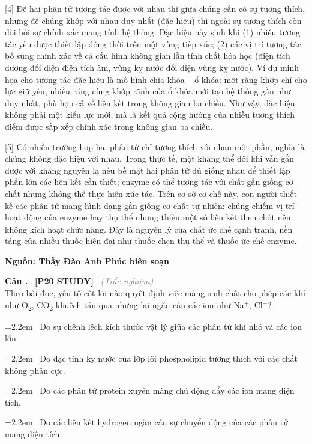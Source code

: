 \documentclass[12pt,a4paper,twoside]{article}
\newcounter{qcounter}
\newcommand{\question}[2][]{%
    \stepcounter{qcounter}%
    \par\vspace{5pt}%
    \noindent\textcolor{primaryBlue}{\textbf{Câu \theqcounter.}}~%
    \textcolor{secondaryBlue}{\small\textbf{[P20 STUDY]}}~%
    \if\relax\detokenize{#1}\relax\else\textcolor{gray}{\small\textit{(#1)}}~\fi\\[1pt]
    \noindent #2%
}
\newcommand{\choiceitem}[2]{%
    \tikz[baseline=-0.5ex]{
        \node[draw=primaryBlue, circle, minimum size=1.5em, inner sep=0pt, thick] {\textbf{#1}};
    }~#2%
}
\newenvironment{readingpassage}[1][]{%
    \begin{tcolorbox}[enhanced, colback=grayLight, colframe=secondaryBlue,
        coltitle=textDark, fonttitle=\bfseries, title={#1},
        rounded corners, arc=3mm, boxrule=1pt,
        left=15pt, right=15pt, top=10pt, bottom=10pt,
        breakable, before skip=10pt, after skip=10pt, drop fuzzy shadow]
    \setstretch{1.3}
}{\end{tcolorbox}}
\begin{document}
\begin{readingpassage}[]
[4] Để hai phân tử tương tác được với nhau thì giữa chúng cần có sự tương thích, nhưng để chúng khớp với nhau duy nhất (đặc hiệu) thì ngoài sự tương thích còn đòi hỏi sự chính xác mang tính hệ thống. Đặc hiệu nảy sinh khi (1) nhiều tương tác yếu được thiết lập đồng thời trên một vùng tiếp xúc; (2) các vị trí tương tác bổ sung chính xác về cả cấu hình không gian lẫn tính chất hóa học (điện tích dương đối diện điện tích âm, vùng kỵ nước đối diện vùng kỵ nước). Ví dụ minh họa cho tương tác đặc hiệu là mô hình chìa khóa -- ổ khóa: một răng khớp chỉ cho lực giữ yếu, nhiều răng cùng khớp rãnh của ổ khóa mới tạo hệ thống gần như duy nhất, phù hợp cả về liên kết trong không gian ba chiều. Như vậy, đặc hiệu không phải một kiểu lực mới, mà là kết quả cộng hưởng của nhiều tương thích điểm được sắp xếp chính xác trong không gian ba chiều.

[5] Có nhiều trường hợp hai phân tử chỉ tương thích với nhau một phần, nghĩa là chúng không đặc hiệu với nhau. Trong thực tế, một kháng thể đôi khi vẫn gắn được với kháng nguyên lạ nếu bề mặt hai phân tử đủ giống nhau để thiết lập phần lớn các liên kết cần thiết; enzyme có thể tương tác với chất gần giống cơ chất nhưng không thể thực hiện xúc tác. Trên cơ sở cơ chế này, con người thiết kế các phân tử mang hình dạng gần giống cơ chất tự nhiên: chúng chiếm vị trí hoạt động của enzyme hay thụ thể nhưng thiếu một số liên kết then chốt nên không kích hoạt chức năng. Đây là nguyên lý của chất ức chế cạnh tranh, nền tảng của nhiều thuốc hiện đại như thuốc chẹn thụ thể và thuốc ức chế enzyme.

\hfill\textbf{Nguồn: Thầy Đào Anh Phúc biên soạn}

\end{readingpassage}
\vspace{2pt}

\question[Trắc nghiệm]{Theo bài đọc, yếu tố cốt lõi nào quyết định việc màng sinh chất cho phép các khí như O\textsubscript{2}, CO\textsubscript{2} khuếch tán qua nhưng lại ngăn cản các ion như Na$^+$, Cl$^-$?}
\par\vspace{4pt}
\noindent\hangindent=2.2em\choiceitem{A}{Do sự chênh lệch kích thước vật lý giữa các phân tử khí nhỏ và các ion lớn.}\par\vspace{4pt}
\noindent\hangindent=2.2em\choiceitem{B}{Do đặc tính kỵ nước của lớp lõi phospholipid tương thích với các chất không phân cực.}\par\vspace{4pt}
\noindent\hangindent=2.2em\choiceitem{C}{Do các phân tử protein xuyên màng chủ động đẩy các ion mang điện tích.}\par\vspace{4pt}
\noindent\hangindent=2.2em\choiceitem{D}{Do các liên kết hydrogen ngăn cản sự chuyển động của các phân tử mang điện tích.}\par\vspace{4pt}
\end{document}
